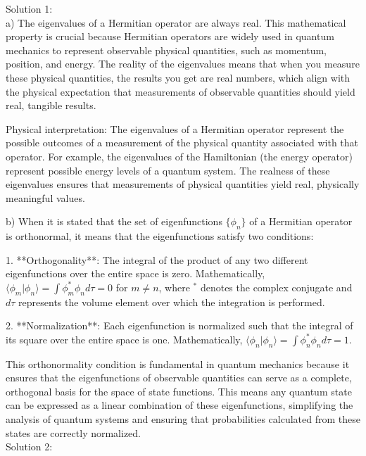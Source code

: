 \documentclass[a4paper,11pt]{article}
\begin{document}
\bigskip

\noindent Solution 1: \\

a) The eigenvalues of a Hermitian operator are always real. This mathematical property is crucial because Hermitian operators are widely used in quantum mechanics to represent observable physical quantities, such as momentum, position, and energy. The reality of the eigenvalues means that when you measure these physical quantities, the results you get are real numbers, which align with the physical expectation that measurements of observable quantities should yield real, tangible results.

Physical interpretation: The eigenvalues of a Hermitian operator represent the possible outcomes of a measurement of the physical quantity associated with that operator. For example, the eigenvalues of the Hamiltonian (the energy operator) represent possible energy levels of a quantum system. The realness of these eigenvalues ensures that measurements of physical quantities yield real, physically meaningful values.

b) When it is stated that the set of eigenfunctions \(\{\phi_{n}\}\) of a Hermitian operator is orthonormal, it means that the eigenfunctions satisfy two conditions:

1. **Orthogonality**: The integral of the product of any two different eigenfunctions over the entire space is zero. Mathematically, \(\langle \phi_{m} | \phi_{n} \rangle = \int \phi_{m}^* \phi_{n} d\tau = 0\) for \(m \neq n\), where \(^*\) denotes the complex conjugate and \(d\tau\) represents the volume element over which the integration is performed.

2. **Normalization**: Each eigenfunction is normalized such that the integral of its square over the entire space is one. Mathematically, \(\langle \phi_{n} | \phi_{n} \rangle = \int \phi_{n}^* \phi_{n} d\tau = 1\).

This orthonormality condition is fundamental in quantum mechanics because it ensures that the eigenfunctions of observable quantities can serve as a complete, orthogonal basis for the space of state functions. This means any quantum state can be expressed as a linear combination of these eigenfunctions, simplifying the analysis of quantum systems and ensuring that probabilities calculated from these states are correctly normalized. \\

\noindent Solution 2: \\
\end{document}
